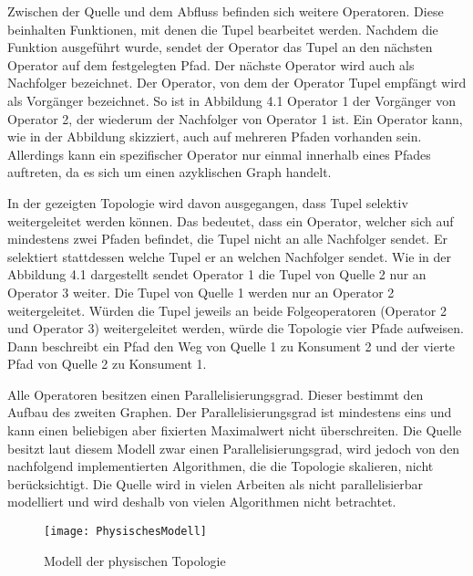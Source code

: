 Zwischen der Quelle und dem Abfluss befinden sich weitere Operatoren. 
Diese beinhalten Funktionen, mit denen die Tupel bearbeitet werden.
Nachdem die Funktion ausgeführt wurde, sendet der Operator das Tupel an den nächsten Operator auf dem festgelegten Pfad.
Der nächste Operator wird auch als Nachfolger bezeichnet.
Der Operator, von dem der Operator Tupel empfängt wird als Vorgänger bezeichnet.
So ist in Abbildung 4.1 Operator 1 der Vorgänger von Operator 2, der wiederum der Nachfolger von Operator 1 ist.
Ein Operator kann, wie in der Abbildung skizziert, auch auf mehreren Pfaden vorhanden sein. 
Allerdings kann ein spezifischer Operator nur einmal innerhalb eines Pfades auftreten, da es sich um einen azyklischen Graph handelt.

In der gezeigten Topologie wird davon ausgegangen, dass Tupel selektiv weitergeleitet werden können.
Das bedeutet, dass ein Operator, welcher sich auf mindestens zwei Pfaden befindet, die Tupel nicht an alle Nachfolger sendet.
Er selektiert stattdessen welche Tupel er an welchen Nachfolger sendet.
Wie in der Abbildung 4.1 dargestellt sendet Operator 1 die Tupel von Quelle 2 nur an Operator 3 weiter.
Die Tupel von Quelle 1 werden nur an Operator 2 weitergeleitet.
Würden die Tupel jeweils an beide Folgeoperatoren (Operator 2 und Operator 3) weitergeleitet werden, würde die Topologie vier Pfade aufweisen.
Dann beschreibt ein Pfad den Weg von Quelle 1 zu Konsument 2 und der vierte Pfad von Quelle 2 zu Konsument 1.

Alle Operatoren besitzen einen Parallelisierungsgrad.
Dieser bestimmt den Aufbau des zweiten Graphen. 
Der Parallelisierungsgrad ist mindestens eins und kann einen beliebigen aber fixierten Maximalwert nicht überschreiten. 
Die Quelle besitzt laut diesem Modell zwar einen Parallelisierungsgrad, wird jedoch von den nachfolgend implementierten Algorithmen, die die Topologie skalieren, nicht berücksichtigt.
Die Quelle wird in vielen Arbeiten als nicht parallelisierbar modelliert und wird deshalb von vielen Algorithmen nicht betrachtet.

\begin{figure}
\texttt{[image: PhysischesModell]}
\caption{Modell der physischen Topologie}
\end{figure}

